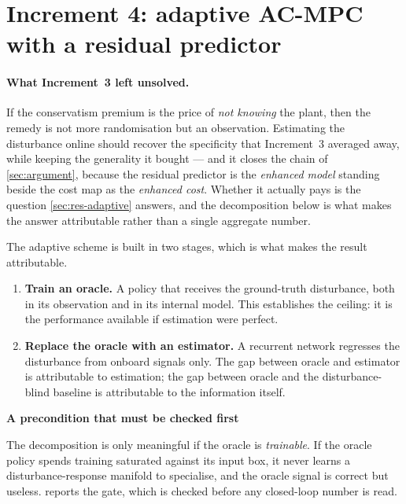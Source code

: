 \documentclass[11pt,a4paper,twoside,openright]{report}
\makeatletter
\renewcommand{\subsection}{\FloatBarrier\old@subsection}}
\theoremstyle{plain}
\theoremstyle{definition}
\theoremstyle{remark}
\newcommand{\keyhead}[1]{\textbf{\sffamily\small\textcolor{NavyDeep}{#1}}\par\vspace{2pt}}
\makeatother
\begin{document}
	\section{Increment 4: adaptive AC-MPC with a residual predictor}
	\label{sec:adaptive}

	\paragraph{What Increment~3 left unsolved.} If the conservatism premium is the
	price of \emph{not knowing} the plant, then the remedy is not more
	randomisation but an observation. Estimating the disturbance online should
	recover the specificity that Increment~3 averaged away, while keeping the
	generality it bought --- and it closes the chain of \cref{sec:argument}, because
	the residual predictor is the \emph{enhanced model} standing beside the cost map
	as the \emph{enhanced cost}. Whether it actually pays is the question
	\cref{sec:res-adaptive} answers, and the decomposition below is what makes the
	answer attributable rather than a single aggregate number.

	\subsection{Decoupled construction}
	\label{sec:decoupled}

	The adaptive scheme is built in two stages, which is what makes the result
	attributable.

	\begin{enumerate}[leftmargin=*]
		\item \textbf{Train an oracle.} A policy that receives the ground-truth
		disturbance, both in its observation and in its internal model. This
		establishes the ceiling: it is the performance available if estimation were
		perfect.
		\item \textbf{Replace the oracle with an estimator.} A recurrent network
		regresses the disturbance from onboard signals only. The gap between oracle
		and estimator is attributable to estimation; the gap between oracle and the
		disturbance-blind baseline is attributable to the information itself.
	\end{enumerate}

	\begin{keybox}
		\keyhead{A precondition that must be checked first}
		The decomposition is only meaningful if the oracle is \emph{trainable}. If the
		oracle policy spends training saturated against its input box, it never learns a
		disturbance-response manifold to specialise, and the oracle signal is correct but
		useless.  reports the gate, which is checked before any
		closed-loop number is read.
	\end{keybox}
\end{document}
